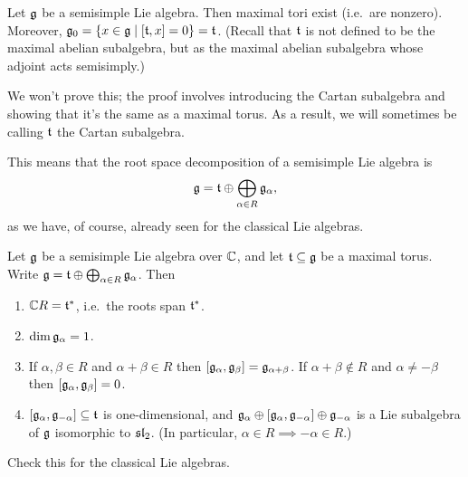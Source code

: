 \begin{proposition}
Let $\g$ be a semisimple Lie algebra. Then maximal tori exist (i.e.\ are
nonzero). Moreover,
$\g_0 = \setc{x \in \g}{[\at, x] = 0} = \at$. (Recall that $\at$ is not defined
to be the maximal abelian subalgebra, but as the maximal abelian subalgebra
whose adjoint acts semisimply.)
\end{proposition}

We won't prove this; the proof involves introducing the Cartan subalgebra and
showing that it's the same as a maximal torus. As a result, we will sometimes
be calling $\at$ the Cartan subalgebra.

This means that the root space decomposition of a semisimple Lie algebra is
\[
  \g = \at \oplus \bigoplus_{\alpha \in R} \g_\alpha,
\]
as we have, of course, already seen for the classical Lie algebras.

\begin{theorem}
Let $\g$ be a semisimple Lie algebra over $\C$, and let $\at \subseteq \g$ be a
maximal torus. Write $\g = \at \oplus \bigoplus_{\alpha \in R} \g_\alpha$. Then
\begin{enumerate}
  \item $\C R = \at^*$, i.e.\ the roots span $\at^*$.
  \item $\dim \g_\alpha = 1$.
  \item If $\alpha, \beta \in R$ and $\alpha + \beta \in R$ then
    $[\g_\alpha, \g_\beta] = \g_{\alpha+\beta}$. If $\alpha + \beta \notin R$
    and $\alpha \neq -\beta$ then $[\g_\alpha, \g_\beta] = 0$.
  \item $[\g_\alpha, \g_{-\alpha}] \subseteq \at$ is one-dimensional, and
    $\g_\alpha \oplus [\g_\alpha, \g_{-\alpha}] \oplus \g_{-\alpha}$ is a Lie
    subalgebra of $\g$ isomorphic to $\sl_2$. (In particular,
    $\alpha \in R \implies -\alpha \in R$.)
\end{enumerate}
\end{theorem}

\begin{exercise}
Check this for the classical Lie algebras.
\end{exercise}


